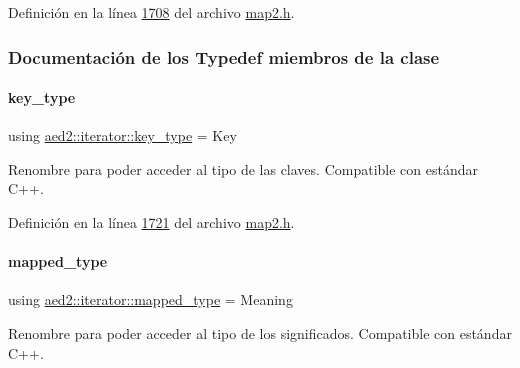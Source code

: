 Definición en la línea \hyperlink{map2_8h_source_l01708}{1708} del archivo \hyperlink{map2_8h_source}{map2.\+h}.



\subsubsection{Documentación de los \textquotesingle{}Typedef\textquotesingle{} miembros de la clase}
\mbox{\label{classaed2_1_1iterator_afd2dbf717b48e5921b9d7f5c97bdf16e_afd2dbf717b48e5921b9d7f5c97bdf16e}} 
\paragraph{\texorpdfstring{key\+\_\+type}{key\_type}}
{\footnotesize\ttfamily using \hyperlink{classaed2_1_1iterator_afd2dbf717b48e5921b9d7f5c97bdf16e_afd2dbf717b48e5921b9d7f5c97bdf16e}{aed2\+::iterator\+::key\+\_\+type} =  Key}



Renombre para poder acceder al tipo de las claves. Compatible con estándar C++. 



Definición en la línea \hyperlink{map2_8h_source_l01721}{1721} del archivo \hyperlink{map2_8h_source}{map2.\+h}.

\mbox{\label{classaed2_1_1iterator_a9616435dd0f809fcd47b1c23264c217e_a9616435dd0f809fcd47b1c23264c217e}} 
\paragraph{\texorpdfstring{mapped\+\_\+type}{mapped\_type}}
{\footnotesize\ttfamily using \hyperlink{classaed2_1_1iterator_a9616435dd0f809fcd47b1c23264c217e_a9616435dd0f809fcd47b1c23264c217e}{aed2\+::iterator\+::mapped\+\_\+type} =  Meaning}



Renombre para poder acceder al tipo de los significados. Compatible con estándar C++. 



